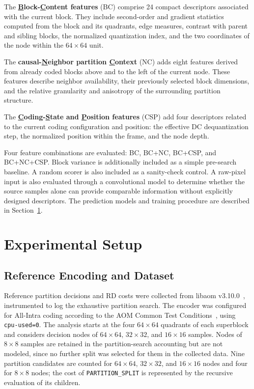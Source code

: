\documentclass{article}
\begin{document}
The \textbf{\underline{B}lock-\underline{C}ontent features} (BC) comprise 24 compact descriptors associated with the current block. They include second-order and gradient statistics computed from the block and its quadrants, edge measures, contrast with parent and sibling blocks, the normalized quantization index, and the two coordinates of the node within the $64\times64$ unit.

The \textbf{causal-\underline{N}eighbor partition \underline{C}ontext} (NC) adds eight features derived from already coded blocks above and to the left of the current node. These features describe neighbor availability, their previously selected block dimensions, and the relative granularity and anisotropy of the surrounding partition structure.

The \textbf{\underline{C}oding-\underline{S}tate and \underline{P}osition features} (CSP) add four descriptors related to the current coding configuration and position: the effective DC dequantization step, the normalized position within the frame, and the node depth.

Four feature combinations are evaluated: BC, BC+NC, BC+CSP, and BC+NC+CSP. Block variance is additionally included as a simple pre-search baseline. A random scorer is also included as a sanity-check control. A raw-pixel input is also evaluated through a convolutional model to determine whether the source samples alone can provide comparable information without explicitly designed descriptors. The prediction models and training procedure are described in Section~\ref{sec:setup}.

\section{Experimental Setup}
\label{sec:setup}

\subsection{Reference Encoding and Dataset}

Reference partition decisions and RD costs were collected from libaom v3.10.0~\cite{aomedia2024libaom}, instrumented to log the exhaustive partition search. The encoder was configured for All-Intra coding according to the AOM Common Test Conditions~\cite{zhao2026aomctc}, using \texttt{cpu-used=0}. The analysis starts at the four $64\times64$ quadrants of each superblock and considers decision nodes of $64\times64$, $32\times32$, and $16\times16$ samples. Nodes of $8\times8$ samples are retained in the partition-search accounting but are not modeled, since no further split was selected for them in the collected data. Nine partition candidates are counted for $64\times64$, $32\times32$, and $16\times16$ nodes and four for $8\times8$ nodes; the cost of \texttt{PARTITION\_SPLIT} is represented by the recursive evaluation of its children.
\end{document}

